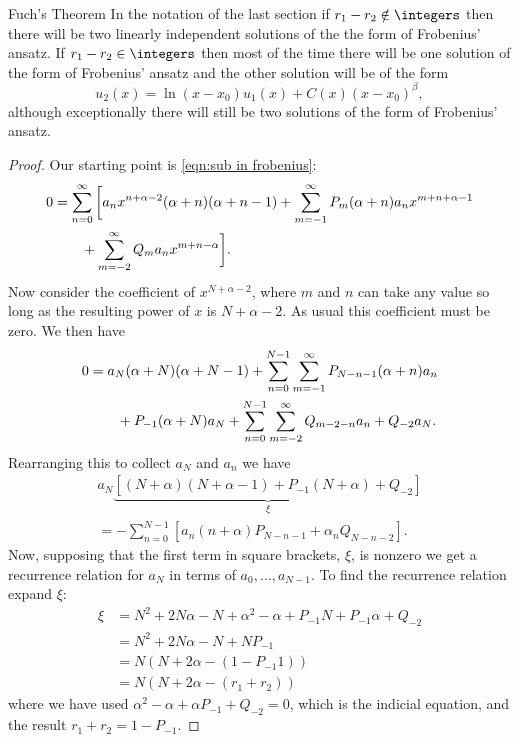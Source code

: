 \documentclass[fleqn]{NotesClass}
\begin{document}
    \begin{thm}{Fuch's Theorem}{}
        In the notation of the last section if \(r_1 - r_2 \notin \integers\) then there will be two linearly independent solutions of the the form of Frobenius' ansatz.
        If \(r_1 - r_2 \in \integers\) then most of the time there will be one solution of the form of Frobenius' ansatz and the other solution will be of the form
        \begin{equation}
            u_2(x) = \ln(x - x_0)u_1(x) + C(x)(x - x_0)^\beta,
        \end{equation}
        although exceptionally there will still be two solutions of the form of Frobenius' ansatz.
        \begin{proof}
            Our starting point is \cref{eqn:sub in frobenius}:
            \begin{align}
                0 &= \sum_{n=0}^{\infty} \bigg[ a_nx^{n+\alpha-2}(\alpha + n)(\alpha + n - 1) + \sum_{m=-1}^{\infty} P_m(\alpha + n)a_nx^{m + n + \alpha - 1}\notag\\
                &\qquad+ \sum_{m=-2}^{\infty} Q_ma_nx^{m+n-\alpha} \bigg].
            \end{align}
            Now consider the coefficient of \(x^{N + \alpha - 2}\), where \(m\) and \(n\) can take any value so long as the resulting power of \(x\) is \(N + \alpha - 2\).
            As usual this coefficient must be zero.
            We then have
            \begin{align}
                0 &= a_N(\alpha + N)(\alpha + N - 1) + \sum_{n=0}^{N - 1}\sum_{m=-1}^{\infty} P_{N - n - 1}(\alpha + n)a_n\notag\\
                &\qquad+ P_{-1}(\alpha + N)a_N + \sum_{n=0}^{N - 1}\sum_{m=-2}^{\infty} Q_{m - 2 - n} a_n + Q_{-2}a_N.
            \end{align}
            Rearranging this to collect \(a_N\) and \(a_n\) we have
            \begin{multline}
                a_N\underbrace{[(N + \alpha)(N + \alpha - 1) + P_{-1}(N + \alpha) + Q_{-2}]}_{\xi}\\
                = -\sum_{n=0}^{N-1}[a_n(n + \alpha)P_{N - n - 1} + \alpha_nQ_{N - n - 2}].
            \end{multline}
            Now, supposing that the first term in square brackets, \(\xi\), is nonzero we get a recurrence relation for \(a_N\) in terms of \(a_0, \dotsc, a_{N - 1}\).
            To find the recurrence relation expand \(\xi\):
            \begin{align}
                \xi &= N^2 + 2N\alpha - N + \alpha^2 - \alpha + P_{-1}N + P_{-1}\alpha + Q_{-2}\\
                &= N^2 + 2N\alpha - N + NP_{-1}\\
                &= N(N + 2\alpha - (1 - P_{-1}1))\\
                &= N(N + 2\alpha - (r_1 + r_2))
            \end{align}
            where we have used \(\alpha^2 - \alpha + \alpha P_{-1} + Q_{-2} = 0\), which is the indicial equation, and the result \(r_1 + r_2 = 1 - P_{-1}\).
            

\end{proof}
\end{thm}
\end{document}
